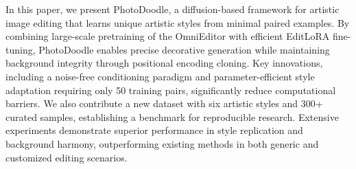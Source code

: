 

In this paper, we present PhotoDoodle, a diffusion-based framework for artistic image editing that learns unique artistic styles from minimal paired examples. By combining large-scale pretraining of the OmniEditor with efficient EditLoRA fine-tuning, PhotoDoodle enables precise decorative generation while maintaining background integrity through positional encoding cloning. Key innovations, including a noise-free conditioning paradigm and parameter-efficient style adaptation requiring only 50 training pairs, significantly reduce computational barriers. We also contribute a new dataset with six artistic styles and 300+ curated samples, establishing a benchmark for reproducible research. Extensive experiments demonstrate superior performance in style replication and background harmony, outperforming existing methods in both generic and customized editing scenarios.

\newpage




